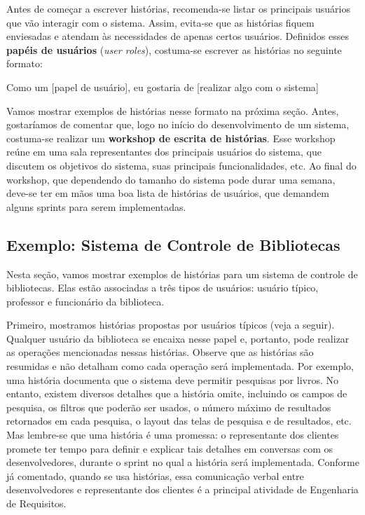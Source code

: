\documentclass[
  11pt,
  twoside]{book}
\renewenvironment{quote}{\centering \vspace{1.5ex} \begin{tcolorbox}[colback=backcolor, width=4.9in]}{\end{tcolorbox}}
\begin{document}
Antes de começar a escrever histórias, recomenda-se listar os principais
usuários que vão interagir com o sistema. Assim, evita-se que as
histórias fiquem enviesadas e atendam às necessidades de apenas certos
usuários. Definidos esses \textbf{papéis de usuários} (\emph{user
roles}), costuma-se escrever as histórias no seguinte formato:

\begin{quote}
Como um {[}papel de usuário{]}, eu gostaria de {[}realizar algo com o
sistema{]}
\end{quote}

 Vamos mostrar exemplos
de histórias nesse formato na próxima seção. Antes, gostaríamos de
comentar que, logo no início do desenvolvimento de um sistema,
costuma-se realizar um \textbf{workshop de escrita de histórias}. Esse
workshop reúne em uma sala representantes dos principais usuários do
sistema, que discutem os objetivos do sistema, suas principais
funcionalidades, etc. Ao final do workshop, que dependendo do tamanho do
sistema pode durar uma semana, deve-se ter em mãos uma boa lista de
histórias de usuários, que demandem alguns sprints para serem
implementadas.

\hypertarget{exemplo-sistema-de-controle-de-bibliotecas}{%
\subsection{Exemplo: Sistema de Controle de
Bibliotecas}\label{exemplo-sistema-de-controle-de-bibliotecas}}

Nesta seção, vamos mostrar exemplos de histórias para um sistema de
controle de bibliotecas. Elas estão associadas a três tipos de usuários:
usuário típico, professor e funcionário da biblioteca.

Primeiro, mostramos histórias propostas por usuários típicos (veja a
seguir). Qualquer usuário da biblioteca se encaixa nesse papel e,
portanto, pode realizar as operações mencionadas nessas histórias.
Observe que as histórias são resumidas e não detalham como cada operação
será implementada. Por exemplo, uma história documenta que o sistema
deve permitir pesquisas por livros. No entanto, existem diversos
detalhes que a história omite, incluindo os campos de pesquisa, os
filtros que poderão ser usados, o número máximo de resultados retornados
em cada pesquisa, o layout das telas de pesquisa e de resultados, etc.
Mas lembre-se que uma história é uma promessa: o representante dos
clientes promete ter tempo para definir e explicar tais detalhes em
conversas com os desenvolvedores, durante o sprint no qual a história
será implementada. Conforme já comentado, quando se usa histórias, essa
comunicação verbal entre desenvolvedores e representante dos clientes é
a principal atividade de Engenharia de Requisitos.
\end{document}
